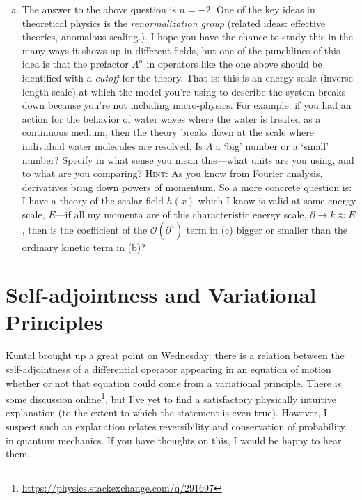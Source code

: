\documentclass[12pt]{article}
\numberwithin{equation}{section}    %
\begin{document}
\begin{enumerate}[(a)]
	\item The answer to the above question is $n=-2$. One of the key ideas in theoretical physics is the \textit{renormalization group} (related ideas: effective theories, anomalous scaling.). I hope you have the chance to study this in the many ways it shows up in different fields, but one of the punchlines of this idea is that the prefactor $\Lambda^n$ in operators like the one above should be identified with a \emph{cutoff} for the theory. That is: this is an energy scale (inverse length scale) at which the model you're using to describe the system breaks down because you're not including micro-physics. For example: if you had an action for the behavior of water waves where the water is treated as a continuous medium, then the theory breaks down at the scale where individual water molecules are resolved. Is $\Lambda$ a `big' number or a `small' number? Specify in what sense you mean this---what units are you using, and to what are you comparing? \textsc{Hint}: As you know from Fourier analysis, derivatives bring down powers of momentum. So a more concrete question is: I have a theory of the scalar field $h(x)$ which I know is valid at some energy scale, $E$---if all my momenta are of this characteristic energy scale, $\partial \to k \approx E$, then is the coefficient of the $\mathcal O(\partial^4)$ term in (c) bigger or smaller than the ordinary kinetic term in (b)?
\end{enumerate}


\section{Self-adjointness and Variational Principles}

Kuntal brought up a great point on Wednesday: there is a relation between the self-adjointness of a differential operator appearing in an equation of motion whether or not that equation could come from a variational principle. There is some discussion online\footnote{\url{https://physics.stackexchange.com/q/291697}}, but I've yet to find a satisfactory physically intuitive explanation (to the extent to which the statement is even true). However, I suspect such an explanation relates reversibility and conservation of probability in quantum mechanics. If you have thoughts on this, I would be happy to hear them.
\end{document}
